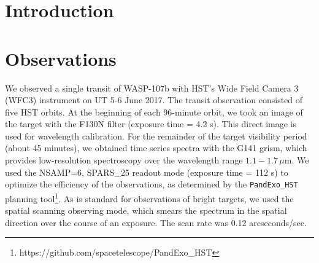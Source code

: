\documentclass[twocolumn]{aastex61}
\begin{document}




\section{Introduction} \label{sec:intro}

\section{Observations}
We observed a single transit of WASP-107b with HST's Wide Field Camera 3 (WFC3) instrument on UT 5-6 June 2017.  The transit observation consisted of five HST orbits. At the beginning of each 96-minute orbit, we took an image of the target with the F130N filter (exposure time = 4.2 s). This direct image is used for wavelength calibration. For the remainder of the target visibility period (about 45 minutes), we obtained time series spectra with the G141 grism, which provides low-resolution spectroscopy over the wavelength range $1.1 - 1.7\,\mu$m.  We used the NSAMP=6, SPARS\_25 readout mode (exposure time = 112 s) to optimize the efficiency of the observations, as determined by the \texttt{PandExo\_HST} planning tool\footnote{https://github.com/spacetelescope/PandExo\_HST}.  As is standard for observations of bright targets, we used the spatial scanning observing mode, which smears the spectrum in the spatial direction over the course of an exposure. The scan rate was 0.12 arcseconds/sec.
\end{document}
